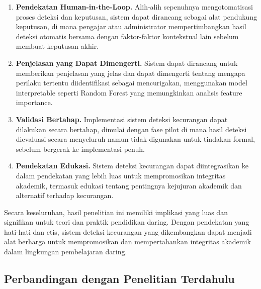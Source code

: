 \begin{enumerate}
    \item \textbf{Pendekatan Human-in-the-Loop.} Alih-alih sepenuhnya mengotomatisasi proses deteksi dan keputusan, sistem dapat dirancang sebagai alat pendukung keputusan, di mana pengajar atau administrator mempertimbangkan hasil deteksi otomatis bersama dengan faktor-faktor kontekstual lain sebelum membuat keputusan akhir.

    \item \textbf{Penjelasan yang Dapat Dimengerti.} Sistem dapat dirancang untuk memberikan penjelasan yang jelas dan dapat dimengerti tentang mengapa perilaku tertentu diidentifikasi sebagai mencurigakan, menggunakan model interpretable seperti Random Forest yang memungkinkan analisis feature importance.

    \item \textbf{Validasi Bertahap.} Implementasi sistem deteksi kecurangan dapat dilakukan secara bertahap, dimulai dengan fase pilot di mana hasil deteksi dievaluasi secara menyeluruh namun tidak digunakan untuk tindakan formal, sebelum bergerak ke implementasi penuh.

    \item \textbf{Pendekatan Edukasi.} Sistem deteksi kecurangan dapat diintegrasikan ke dalam pendekatan yang lebih luas untuk mempromosikan integritas akademik, termasuk edukasi tentang pentingnya kejujuran akademik dan alternatif terhadap kecurangan.
\end{enumerate}

Secara keseluruhan, hasil penelitian ini memiliki implikasi yang luas dan signifikan untuk teori dan praktik pendidikan daring. Dengan pendekatan yang hati-hati dan etis, sistem deteksi kecurangan yang dikembangkan dapat menjadi alat berharga untuk mempromosikan dan mempertahankan integritas akademik dalam lingkungan pembelajaran daring.

\subsection{Perbandingan dengan Penelitian Terdahulu}
